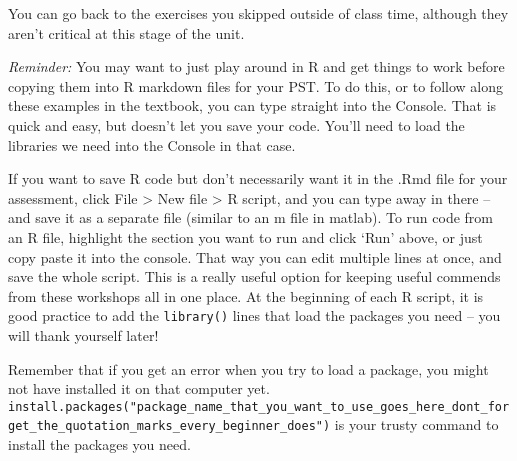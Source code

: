 \documentclass[]{article}
\begin{document}
You can go back to the exercises you skipped outside of class time,
although they aren't critical at this stage of the unit.

\emph{Reminder:} You may want to just play around in R and get things to
work before copying them into R markdown files for your PST. To do this,
or to follow along these examples in the textbook, you can type straight
into the Console. That is quick and easy, but doesn't let you save your
code. You'll need to load the libraries we need into the Console in that
case.

If you want to save R code but don't necessarily want it in the .Rmd
file for your assessment, click File \textgreater{} New file
\textgreater{} R script, and you can type away in there -- and save it
as a separate file (similar to an m file in matlab). To run code from an
R file, highlight the section you want to run and click `Run' above, or
just copy paste it into the console. That way you can edit multiple
lines at once, and save the whole script. This is a really useful option
for keeping useful commends from these workshops all in one place. At
the beginning of each R script, it is good practice to add the
\texttt{library()} lines that load the packages you need -- you will
thank yourself later!

Remember that if you get an error when you try to load a package, you
might not have installed it on that computer yet.
\texttt{install.packages("package\_name\_that\_you\_want\_to\_use\_goes\_here\_dont\_forget\_the\_quotation\_marks\_every\_beginner\_does")}
is your trusty command to install the packages you need.
\end{document}
